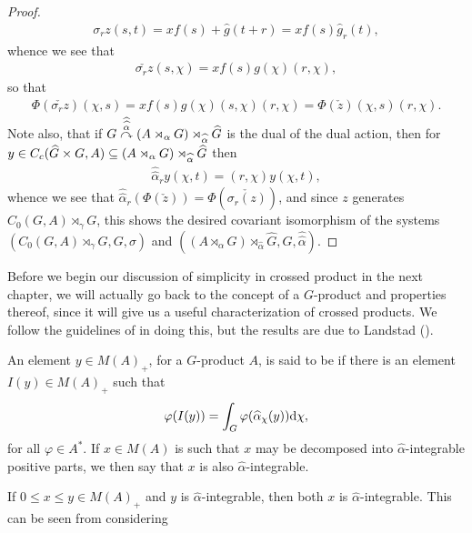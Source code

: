 \begin{proof}
\begin{align*}
	\sigma_r z(s,t) = x f(s) + \hat g(t+r) = x f(s) \hat g_r(t),
\end{align*}
whence we see that
\begin{align*}
	\check{ \sigma_r z}(s,\chi) = x f(s) g(\chi) (r,\chi),
\end{align*}
so that
\begin{align*}
\Phi(\check{ \sigma_r z})(\chi,s) = x f(s) g(\chi)(s,\chi)(r,\chi) = \Phi(\check z)(\chi,s) (r,\chi).
\end{align*}
Note also, that if $G \stackrel{\widehat{\widehat{\alpha}}}{\curvearrowright} (A \rtimes_\alpha G) \rtimes_{\widehat{\alpha}} \widehat{G}$ is the dual of the dual action, then for $y \in C_c(\widehat{G} \times G, A) \subseteq (A \rtimes_\alpha G) \rtimes_{\widehat{\alpha}} \widehat{G}$ then
\begin{align*}
	\hat{\hat{\alpha}}_r y(\chi,t) = (r,\chi) y(\chi,t),
\end{align*}
whence we see that $\hat{\hat{\alpha}}_r(\Phi(\check z))= \Phi(\check{\sigma_r (z)})$, and since $z$ generates $C_0(G,A) \rtimes_\gamma G$, this shows the desired covariant isomorphism of the systems $(C_0(G,A) \rtimes_\gamma G, G, \sigma)$ and $( (A \rtimes_\alpha G)\rtimes_{\hat{\alpha}} \hat G, G, \hat{\hat{\alpha}})$.
\end{proof}

Before we begin our discussion of simplicity in crossed product in the next chapter, we will actually go back to the concept of a $G$-product and properties thereof, since it will give us a useful characterization of crossed products. We follow the guidelines of \cite{olesenpedersen1} in doing this, but the results are due to Landstad (\cite{landstad1979duality}).
\begin{definition}
	An element $y \in M(A)_+$, for a $G$-product $A$, is said to be  if there is an element $I(y) \in M(A)_+$ such that
	\begin{align*}
		\varphi(I(y)) = \int_G \varphi(\widehat{\alpha}_\chi (y)) \mathrm{d} \chi,
	\end{align*}
	for all $\varphi \in A^*$. If $x \in M(A)$ is such that $x$ may be decomposed into $\hat \alpha$-integrable positive parts, we then say that $x$ is also $\hat \alpha$-integrable.
\end{definition}
\begin{note}
	If $0 \leq x \leq y \in M(A)_+$ and $y$ is $\hat \alpha$-integrable, then both $x$ is $\hat \alpha$-integrable. This can be seen from considering  
\end{note}


